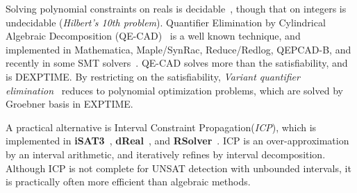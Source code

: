 \documentclass[runningheads,a4paper,oribibl]{llncs}
\begin{document}
Solving polynomial constraints on reals is decidable~\cite{tarski}, 
though that on integers is undecidable ({\em Hilbert's 10th problem}). 
Quantifier Elimination by Cylindrical Algebraic Decomposition (QE-CAD)~\cite{qecad} 
is a well known technique, and 
implemented in Mathematica, Maple/SynRac, Reduce/Redlog, QEPCAD-B, and recently 
in some SMT solvers~\cite{Jovanovic13,smtrat}.   %
QE-CAD solves more than the satisfiability, and is DEXPTIME. %
By restricting on the satisfiability, {\em Variant quantifier elimination}~\cite{Hong2012883} reduces to 
polynomial optimization problems, which are solved by Groebner basis in EXPTIME. 

A practical alternative is Interval Constraint Propagation({\em ICP})\cite{benhamou:hal-00480814}, 
which is implemented in {\bf iSAT3}~\cite{isat}, {\bf dReal}~\cite{dRealCADE13}, and \textbf{RSolver}~\cite{rsolver}. 
ICP is an over-approximation by an interval arithmetic, and iteratively refines by
interval decomposition. 
Although ICP is not complete for UNSAT detection with unbounded intervals, 
it is practically often more efficient than algebraic methods. 

\end{document}
